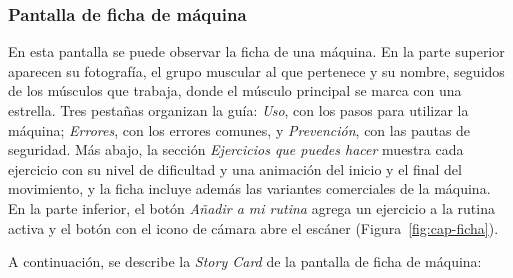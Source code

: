 \subsubsection{Pantalla de ficha de máquina}

En esta pantalla se puede observar la ficha de una máquina. En la parte
superior aparecen su fotografía, el grupo muscular al que pertenece y su
nombre, seguidos de los músculos que trabaja, donde el músculo principal se
marca con una estrella. Tres pestañas organizan la guía: \emph{Uso}, con los
pasos para utilizar la máquina; \emph{Errores}, con los errores comunes, y
\emph{Prevención}, con las pautas de seguridad. Más abajo, la sección
\emph{Ejercicios que puedes hacer} muestra cada ejercicio con su nivel de
dificultad y una animación del inicio y el final del movimiento, y la ficha
incluye además las variantes comerciales de la máquina. En la parte inferior,
el botón \emph{Añadir a mi rutina} agrega un ejercicio a la rutina activa y el
botón con el icono de cámara abre el escáner (Figura~\ref{fig:cap-ficha}).


A continuación, se describe la \emph{Story Card} de la pantalla de ficha de máquina:

